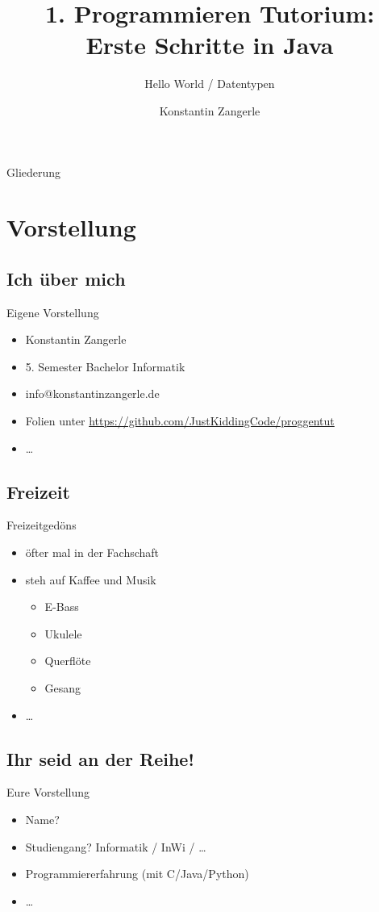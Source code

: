 \documentclass{beamer}
\title[Programmieren Tutorium]{1. Programmieren Tutorium:\\ Erste Schritte in Java}
\subtitle{Hello World / Datentypen}
\author{Konstantin Zangerle}
\begin{document}
\begin{frame}
\titlepage
\end{frame}

\begin{frame}{Gliederung}
\tableofcontents
\end{frame}

\section{Vorstellung}
\subsection{Ich über mich}
\begin{frame}{Eigene Vorstellung}
\begin{itemize}
\item Konstantin Zangerle
\item 5. Semester Bachelor Informatik
\item info@konstantinzangerle.de
\item Folien unter \url{https://github.com/JustKiddingCode/proggentut}
\item \dots
\end{itemize}
\end{frame}

\subsection{Freizeit}
\begin{frame}{Freizeitgedöns}
\begin{itemize}
\item öfter mal in der Fachschaft
\item steh auf Kaffee und Musik
\begin{itemize}
 \item E-Bass
 \item Ukulele
 \item Querflöte
 \item Gesang
\end{itemize}

\item \dots
\end{itemize}
\end{frame}

\subsection{Ihr seid an der Reihe!}
\begin{frame}{Eure Vorstellung}
\begin{itemize}
\item Name?
\item Studiengang? Informatik / InWi / \dots
\item Programmiererfahrung (mit C/Java/Python)
\item \dots
\end{itemize}
\end{frame}
\end{document}
